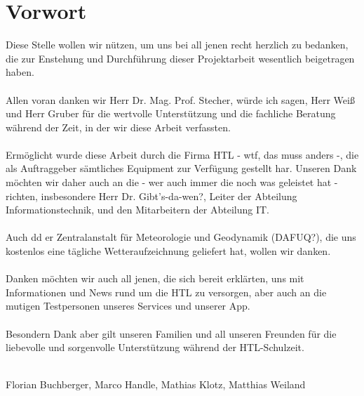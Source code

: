 \chapter{Vorwort}


Diese Stelle wollen wir nützen, um uns bei all jenen recht herzlich zu bedanken, die zur Enstehung und Durchführung dieser Projektarbeit wesentlich beigetragen haben.\\
\\
Allen voran danken wir Herr Dr. Mag. Prof. Stecher, würde ich sagen, Herr Weiß und Herr Gruber für die wertvolle Unterstützung und die fachliche Beratung während der Zeit, in der wir diese Arbeit verfassten.\\
\\
Ermöglicht wurde diese Arbeit durch die Firma HTL - wtf, das muss anders -, die als Auftraggeber sämtliches Equipment zur Verfügung gestellt har. Unseren Dank möchten wir daher auch an die - wer auch immer die noch was geleistet hat - richten, insbesondere Herr Dr. Gibt's-da-wen?, Leiter der Abteilung Informationstechnik, und den Mitarbeitern der Abteilung IT.\\
\\
Auch dd er Zentralanstalt für Meteorologie und Geodynamik (DAFUQ?), die uns kostenlos eine tägliche Wetteraufzeichnung geliefert hat, wollen wir danken.\\
\\
Danken möchten wir auch all jenen, die sich bereit erklärten, uns mit Informationen und News rund um die HTL zu versorgen, aber auch an die mutigen Testpersonen unseres Services und unserer App.\\
\\
Besondern Dank aber gilt unseren Familien und all unseren Freunden für die liebevolle und sorgenvolle Unterstützung während der HTL-Schulzeit.\\
\\
\begin{flushright}
Florian Buchberger, Marco Handle, Mathias Klotz, Matthias Weiland
\end{flushright}